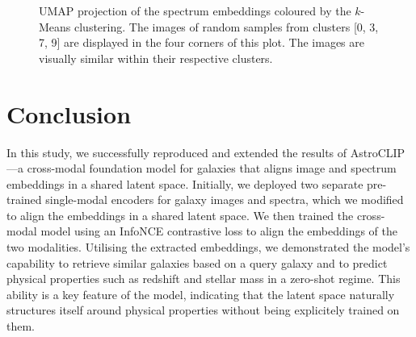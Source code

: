 \documentclass[a4paper,12pt]{article}
\begin{document}
\begin{figure}[H]
    \centering
    \caption{UMAP projection of the spectrum embeddings coloured by the $k$-Means clustering. The images of random samples from clusters [0, 3, 7, 9] are displayed in the four corners of this plot. The images are visually similar within their respective clusters.}
    \label{fig:annotated_images}

    
\end{figure}




\section{Conclusion}
In this study, we successfully reproduced and extended the results of AstroCLIP—a cross-modal foundation model for galaxies that aligns image and spectrum embeddings in a shared latent space. Initially, we deployed two separate pre-trained single-modal encoders for galaxy images and spectra, which we modified to align the embeddings in a shared latent space. We then trained the cross-modal model using an InfoNCE contrastive loss to align the embeddings of the two modalities. Utilising the extracted embeddings, we demonstrated the model's capability to retrieve similar galaxies based on a query galaxy and to predict physical properties such as redshift and stellar mass in a zero-shot regime. This ability is a key feature of the model, indicating that the latent space naturally structures itself around physical properties without being explicitely trained on them.
\end{document}
